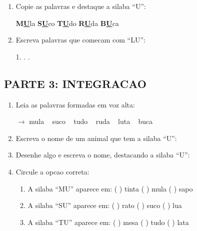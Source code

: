 \begin{exercicio}
\begin{enumerate}[resume]
  \item Copie as palavras e destaque a silaba ``U'':
  \begin{center}
  \textbf{M}\underline{\textbf{U}}la \quad \textbf{S}\underline{\textbf{U}}co \quad \textbf{T}\underline{\textbf{U}}do \quad \textbf{R}\underline{\textbf{U}}da \quad \textbf{B}\underline{\textbf{U}}ca
  \end{center}

  \item Escreva palavras que comecam com ``LU'':
  \begin{center}
  1. \underline{\hspace{3cm}} . \underline{\hspace{3cm}} . \underline{\hspace{3cm}}
  \end{center}
\end{enumerate}

\subsection*{PARTE 3: INTEGRACAO}

\begin{enumerate}[resume]
  \item Leia as palavras formadas em voz alta:
  \begin{center}
  $\rightarrow$ mula  ~  suco  ~  tudo  ~  ruda  ~  luta  ~  buca
  \end{center}

  \item Escreva o nome de um animal que tem a silaba ``U'':
  \begin{center}
  \underline{\hspace{6cm}}
  \end{center}

  \item Desenhe algo e escreva o nome, destacando a silaba ``U'':
  \begin{center}
  \end{center}

  \item Circule a opcao correta:
  \begin{enumerate}[label=(\alph*)]
    \item A silaba ``MU'' aparece em: ( ) tinta ( ) mula ( ) sapo
    \item A silaba ``SU'' aparece em: ( ) rato ( ) suco ( ) lua
    \item A silaba ``TU'' aparece em: ( ) mesa ( ) tudo ( ) lata
  \end{enumerate}


\end{enumerate}
\end{exercicio}
